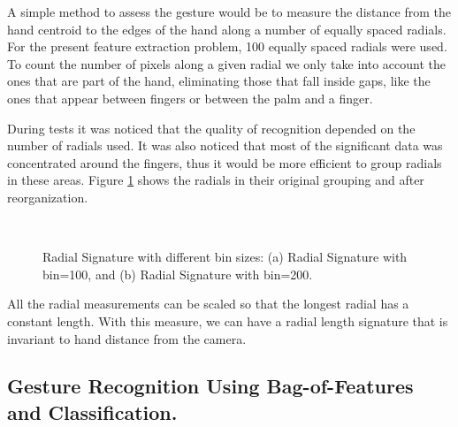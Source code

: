 A simple method to assess the gesture would be to measure the distance from the hand centroid to the edges of the hand along a number of equally spaced radials. For the present feature extraction problem, 100 equally spaced radials were used. To count the number of pixels along a given radial we only take into account the ones that are part of the hand, eliminating those that fall inside gaps, like the ones that appear between fingers or between the palm and a finger.
\bigskip

During tests it was noticed that the quality of recognition depended on the number of radials used. It was also noticed that most of the significant data was concentrated around the fingers, thus it would be more efficient to group radials in these areas. Figure \ref{fig:radial_bins} shows the radials in their original grouping and after reorganization.
\bigskip
\begin{figure}[h]
\begin{dBox}
\centering
  \mbox{
   }
   \caption{Radial Signature with different bin sizes: (a) Radial Signature with bin=100, and (b) Radial Signature with bin=200. \cite{feature4} \label{fig:radial_bins} }   
\end{dBox}   
\end{figure}

All the radial measurements can be scaled so that the longest radial has a constant length. With this measure, we can have a radial length signature that is invariant to hand distance from the camera.

\subsection{Gesture Recognition Using Bag-of-Features and Classification.}
